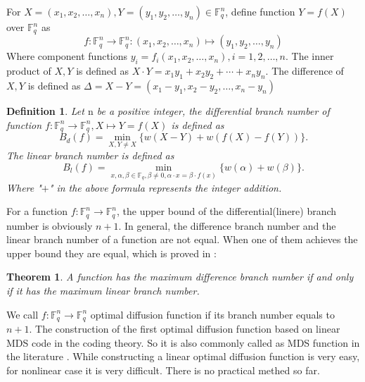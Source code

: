 \documentclass[12pt,a4paper]{article}
\newcommand{\0}{\textbf{0}}
\newcommand{\1}{\textbf{1}}
\newtheorem{theorem}{Theorem}
\newtheorem{definition}{Definition}
\begin{document}
    For $X=\left(x_{1}, x_{2}, \dots, x_{n}\right), Y=\left(y_{1}, y_{2}, \dots, y_{n}\right) \in \mathbb{F}_q^n$, define function $Y=f(X)$ over $\mathbb{F}_q^n$ as
    \begin{equation}\label{eq:1}
        f: \mathbb{F}_q^n \rightarrow \mathbb{F}_q^n:\left(x_{1}, x_{2}, \dots, x_{n}\right) \mapsto\left(y_{1}, y_{2}, \dots, y_{n}\right)
    \end{equation}
    Where component functions $y_{i}=f_{i}\left(x_{1}, x_{2}, \dots, x_{n}\right), i=1,2, \dots, n$.
    The inner product of $X, Y$ is defined as $X \cdot Y=x_{1} y_{1}+x_{2} y_{2}+\cdots+x_{n} y_{n}$. The difference of $X, Y$ is defined as $\Delta=X-Y=\left(x_{1}-y_{1}, x_{2}-y_{2}, \dots, x_{n}-y_{n}\right)$
    \begin{definition}
        Let $\mathrm{n}$ be a positive integer, the differential branch number of function $f: \mathbb{F}_q^n \rightarrow\mathbb{F}_q^n, X \mapsto Y=f(X)$ is defined as
        $$
        B_{d}(f)=\min _{X, Y \neq X}\{w(X-Y)+w(f(X)-f(Y))\}.
        $$
        The linear branch number is defined as
        $$
        B_{l}(f)=\min _{x, \alpha, \beta \in \mathbb{F}_{{q}}, \beta \neq 0, \alpha \cdot x=\beta \cdot f(x)}\{w(\alpha)+w(\beta)\}.
        $$
        Where "$+$" in the above formula represents the integer addition.
    \end{definition}
    For a function $f: \mathbb{F}_q^n \rightarrow \mathbb{F}_q^n$, the upper bound of the differential(linere) branch number is obviously $n+1$. 
    In general, the difference branch number and the linear branch number of a function are not equal. 
    When one of them achieves the upper bound they are equal, which is proved in \cite{dawu2003advanced}:
    \begin{theorem}
        \cite{dawu2003advanced} A function has the maximum difference branch number if and only if it has the maximum linear branch number.
    \end{theorem}
    We call $f:\mathbb{F}_q^n\rightarrow \mathbb{F}_q^n$  optimal diffusion function if its branch number equals to $n+ 1$. 
    The construction of the first optimal diffusion function based on linear MDS code \cite{daemen1995cipher} in the coding theory. 
    So it is also commonly called as MDS function in the literature .
    While constructing a linear optimal diffusion function is very easy, for nonlinear case it is very difficult. 
    There is no practical methed so far. 
\end{document}
